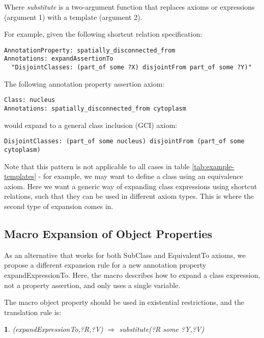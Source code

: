 \documentclass{llncs}
\newtheorem{exprule}{}[section]
\begin{document}
Where \emph{substitute} is a two-argument function that replaces
axioms or expressions (argument 1) with a template (argument 2).

For example, given the following shortcut relation specification:

\begin{verbatim}
AnnotationProperty: spatially_disconnected_from
Annotations: expandAssertionTo 
  "DisjointClasses: (part_of some ?X) disjointFrom part_of some ?Y)"
\end{verbatim}

The following annotation property assertion axiom:

\begin{verbatim}
Class: nucleus
Annotations: spatially_disconnected_from cytoplasm
\end{verbatim}

would expand to a general class inclusion (GCI) axiom:

\begin{verbatim}
DisjointClasses: (part_of some nucleus) disjointFrom (part_of some cytoplasm)
\end{verbatim}

Note that this pattern is not applicable to all cases in table
\ref{tab:example-templates} - for example, we may want to define a
class using an equivalence axiom. Here we want a generic way of
expanding class expressions using shortcut relations, such that they
can be used in different axiom types. This is where the second type of
expansion comes in.

\subsection{Macro Expansion of Object Properties}

As an alternative that works for both SubClass and EquivalentTo
axioms, we propose a different expansion rule for a new annotation
property expandExpressionTo. Here, the macro describes how to expand a class
expression, not a property assertion, and only uses a single variable.

The macro object property should be used in existential restrictions,
and the translation rule is:

\begin{exprule}\label{exp-some}
(expandExpressionTo,?R,?V)  $\Rightarrow$ \newline
substitute(?R some ?Y,?V)
\end{exprule}
\end{document}
